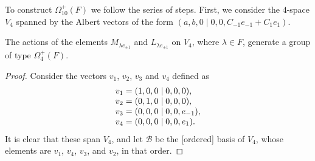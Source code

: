 To construct $\Omega_{10}^+(F)$ we follow the series of steps. First, we consider the
$4$-space $V_4$ spanned by the Albert vectors of the form 
\mbox{$(a,b,0\mid 0,0,C_{-1}e_{-1} + C_1 e_1)$}. 

\begin{lemma}
	The actions of the elements $M_{\lambda e_{\pm 1}}$ and $L_{\lambda e_{\pm 1}}$
	on $V_4$, where $\lambda \in F$, generate a group of type $\Omega_4^+(F)$.
\end{lemma}

\begin{proof}
	Consider the vectors $v_1$, $v_2$, $v_3$ and $v_4$ defined as
	\begin{equation*}
		\begin{array}{r@{\;}c@{\;}l}
			v_1 & = & (1,0,0 \mid 0,0,0), \\
			v_2 & = & (0,1,0 \mid 0,0,0), \\
			v_3 & = & (0,0,0 \mid 0,0,e_{-1}), \\
			v_4 & = & (0,0,0 \mid 0,0,e_1).
		\end{array}
	\end{equation*}
	It is clear that these span $V_4$, and let $\mathcal{B}$ be 
	the [ordered] basis of $V_4$, whose
	elements are $v_1$, $v_4$, $v_3$, and $v_2$, in that order. 
	

\end{proof}
